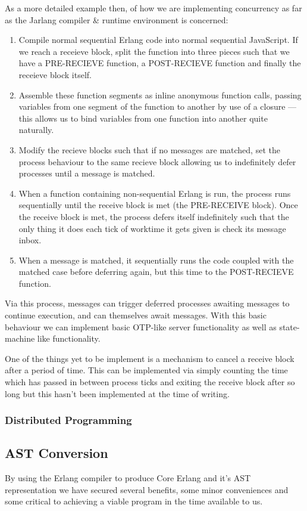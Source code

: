 \documentclass[twoside,12pt,titlepage,a4paper]{article}
\begin{document}
As a more detailed example then, of how we are implementing concurrency as far as the Jarlang compiler \& runtime environment is concerned: 

\begin{enumerate}
\item Compile normal sequential Erlang code into normal sequential JavaScript. If we reach a receieve block, split the function into three pieces such that we have a PRE-RECIEVE function, a POST-RECIEVE function and finally the receieve block itself.
\item Assemble these function segments as inline anonymous function calls, passing variables from one segment of the function to another by use of a closure --- this allows us to bind variables from one function into another quite naturally.
\item Modify the recieve blocks such that if no messages are matched, set the process behaviour to the same recieve block allowing us to indefinitely defer processes until a message is matched.
\item When a function containing non-sequential Erlang is run, the process runs sequentially until the receive block is met (the PRE-RECEIVE block). Once the receive block is met, the process defers itself indefinitely such that the only thing it does each tick of worktime it gets given is check its message inbox.
\item When a message is matched, it sequentially runs the code coupled with the matched case before deferring again, but this time to the POST-RECIEVE function.
\end{enumerate}

Via this process, messages can trigger deferred processes awaiting messages to continue execution, and can themselves await messages. With this basic behaviour we can implement basic OTP-like server functionality as well as state-machine like functionality.

One of the things yet to be implement is a mechanism to cancel a receive block after a period of time. This can be implemented via simply counting the time which has passed in between process ticks and exiting the receive block after so long but this hasn't been implemented at the time of writing.

\subsubsection{Distributed Programming}

\subsection{AST Conversion}
By using the Erlang compiler to produce Core Erlang and it's AST representation we have secured several benefits, some minor conveniences and some critical to achieving a viable program in the time available to us.
\end{document}
